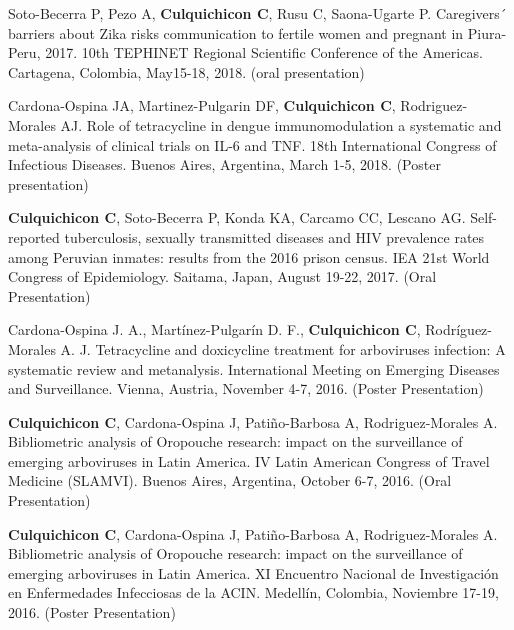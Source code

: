 \documentclass[10pt]{article}
\begin{document}
\begin{etaremune}
	\item Soto-Becerra P, Pezo A, {\bf Culquichicon C}, Rusu C, Saona-Ugarte P. Caregivers´ barriers about Zika risks communication to fertile women and pregnant in Piura-Peru, 2017. 10th TEPHINET Regional Scientific Conference of the Americas. Cartagena, Colombia, May15-18, 2018. (oral presentation) \\
	\vspace{-0.23in}

	\item Cardona-Ospina JA, Martinez-Pulgarin DF, {\bf Culquichicon C}, Rodriguez-Morales AJ. Role of tetracycline in dengue immunomodulation a systematic and meta-analysis of clinical trials on IL-6 and TNF. 18th International Congress of Infectious Diseases. Buenos Aires, Argentina, March 1-5, 2018. (Poster presentation) \\
	\vspace{-0.23in}

	\item {\bf Culquichicon C}, Soto-Becerra P, Konda KA, Carcamo CC, Lescano AG. Self-reported tuberculosis, sexually transmitted diseases and HIV prevalence rates among Peruvian inmates: results from the 2016 prison census. IEA 21st World Congress of Epidemiology. Saitama, Japan, August 19-22, 2017. (Oral Presentation) \\
	\vspace{-0.23in}

	\item Cardona-Ospina J. A., Martínez-Pulgarín D. F., {\bf Culquichicon C}, Rodríguez-Morales A. J. Tetracycline and doxicycline treatment for arboviruses infection: A systematic review and metanalysis. International Meeting on Emerging Diseases and Surveillance. Vienna, Austria, November 4-7, 2016. (Poster Presentation) \\
	\vspace{-0.23in}

	\item {\bf Culquichicon C}, Cardona-Ospina J, Patiño-Barbosa A, Rodriguez-Morales A. Bibliometric analysis of Oropouche research: impact on the surveillance of emerging arboviruses in Latin America. IV Latin American Congress of Travel Medicine (SLAMVI). Buenos Aires, Argentina, October 6-7, 2016. (Oral Presentation) \\
	\vspace{-0.23in}

	\item {\bf Culquichicon C}, Cardona-Ospina J, Patiño-Barbosa A, Rodriguez-Morales A. Bibliometric analysis of Oropouche research: impact on the surveillance of emerging arboviruses in Latin America. XI Encuentro Nacional de Investigación en Enfermedades Infecciosas de la ACIN. Medellín, Colombia, Noviembre 17-19, 2016. (Poster Presentation)	
	
	
	\end{etaremune}
\end{document}
